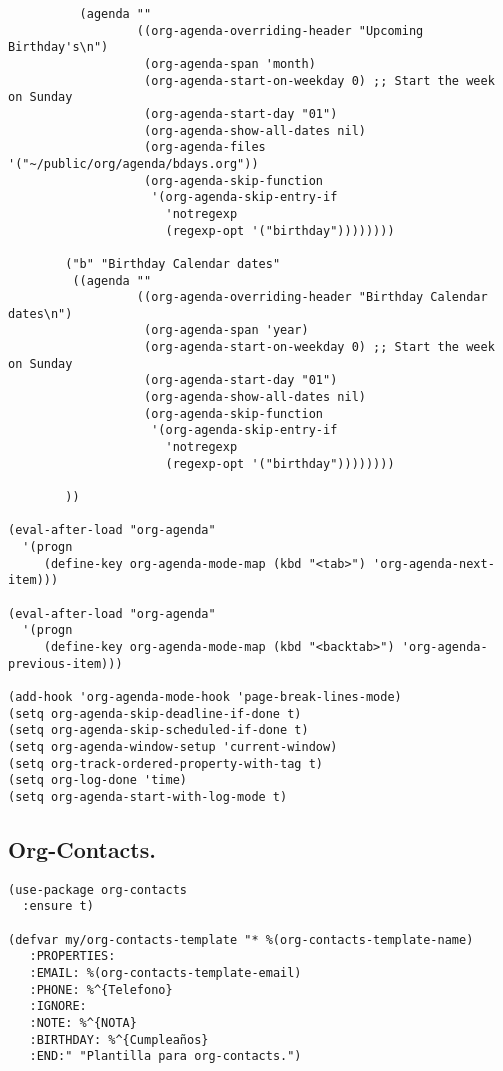 \documentclass[11pt]{article}
\begin{document}
\begin{verbatim}
          (agenda ""
                  ((org-agenda-overriding-header "Upcoming Birthday's\n")
                   (org-agenda-span 'month)
                   (org-agenda-start-on-weekday 0) ;; Start the week on Sunday
                   (org-agenda-start-day "01")
                   (org-agenda-show-all-dates nil)
                   (org-agenda-files '("~/public/org/agenda/bdays.org"))
                   (org-agenda-skip-function
                    '(org-agenda-skip-entry-if
                      'notregexp
                      (regexp-opt '("birthday"))))))))

        ("b" "Birthday Calendar dates"
         ((agenda ""
                  ((org-agenda-overriding-header "Birthday Calendar dates\n")
                   (org-agenda-span 'year)
                   (org-agenda-start-on-weekday 0) ;; Start the week on Sunday
                   (org-agenda-start-day "01")
                   (org-agenda-show-all-dates nil)
                   (org-agenda-skip-function
                    '(org-agenda-skip-entry-if
                      'notregexp
                      (regexp-opt '("birthday"))))))))

        ))

(eval-after-load "org-agenda"
  '(progn
     (define-key org-agenda-mode-map (kbd "<tab>") 'org-agenda-next-item)))

(eval-after-load "org-agenda"
  '(progn
     (define-key org-agenda-mode-map (kbd "<backtab>") 'org-agenda-previous-item)))

(add-hook 'org-agenda-mode-hook 'page-break-lines-mode)
(setq org-agenda-skip-deadline-if-done t)
(setq org-agenda-skip-scheduled-if-done t)
(setq org-agenda-window-setup 'current-window)
(setq org-track-ordered-property-with-tag t)
(setq org-log-done 'time)
(setq org-agenda-start-with-log-mode t)
\end{verbatim}
\subsection{Org-Contacts.}
\label{sec:orgcb3b0f5}
\begin{verbatim}
(use-package org-contacts
  :ensure t)

(defvar my/org-contacts-template "* %(org-contacts-template-name)
   :PROPERTIES:
   :EMAIL: %(org-contacts-template-email)
   :PHONE: %^{Telefono}
   :IGNORE:
   :NOTE: %^{NOTA}
   :BIRTHDAY: %^{Cumpleaños}
   :END:" "Plantilla para org-contacts.")
\end{verbatim}
\end{document}
